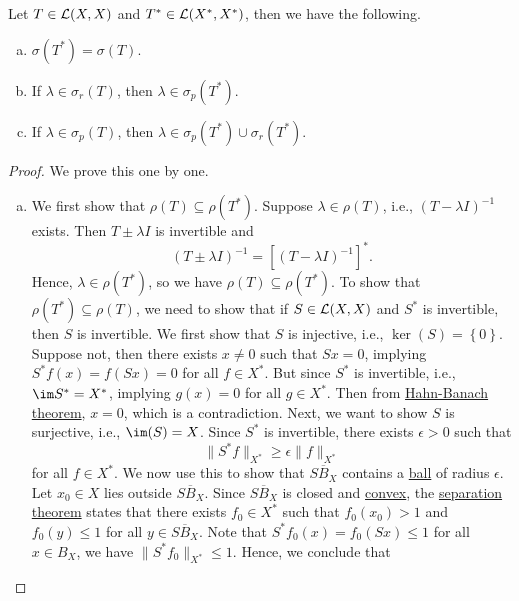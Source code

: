 \begin{theorem}
	Let \(T\in \mathcal{\MakeUppercase{l}} (X, X)\) and \(T^{\ast} \in \mathcal{\MakeUppercase{l}} (X^{\ast} , X^{\ast} )\), then we have the following.
	\begin{enumerate}[(a)]
		\item \(\sigma (T^{\ast} ) = \sigma (T)\).
		\item If \(\lambda \in \sigma _r(T)\), then \(\lambda \in \sigma _p(T^{\ast} )\).
		\item If \(\lambda \in \sigma _p(T)\), then \(\lambda \in \sigma _p(T^{\ast} ) \cup \sigma _r(T^{\ast} )\).
	\end{enumerate}
\end{theorem}
\begin{proof}
	We prove this one by one.
	\begin{enumerate}[(a)]
		\item We first show that \(\rho (T) \subseteq \rho (T^{\ast})\). Suppose \(\lambda \in \rho (T)\), i.e., \((T-\lambda I)^{-1} \) exists. Then \(T\pm \lambda I\) is invertible and
		      \[
			      (T\pm \lambda I)^{-1} = \left[ (T-\lambda I)^{-1}  \right] ^{\ast}.
		      \]
		      Hence, \(\lambda \in \rho (T^{\ast} )\), so we have \(\rho (T) \subseteq \rho (T^{\ast})\). To show that \(\rho (T^{\ast}) \subseteq \rho (T)\), we need to show that if \(S\in \mathcal{\MakeUppercase{l}} (X, X)\) and \(S^{\ast} \) is invertible, then \(S\) is invertible. We first show that \(S\) is injective, i.e., \(\ker(S)= \left\{ 0 \right\} \). Suppose not, then there exists \(x \neq 0\) such that \(Sx = 0\), implying \(S^{\ast} f(x) = f(Sx) = 0\) for all \(f\in X^{\ast} \). But since \(S^{\ast} \) is invertible, i.e., \(\im S^{\ast} = X^{\ast} \), implying \(g(x) = 0\) for all \(g\in X^{\ast} \). Then from \hyperref[thm:Hahn-Banach]{Hahn-Banach theorem}, \(x = 0\), which is a contradiction. Next, we want to show \(S\) is surjective, i.e., \(\im(S) = X\). Since \(S^{\ast} \) is invertible, there exists \(\epsilon >0\) such that
		      \[
			      \lVert S^{\ast} f \rVert _{X^{\ast} }\geq \epsilon \lVert f \rVert _{X^{\ast}}
		      \]
		      for all \(f\in X^{\ast} \). We now use this to show that \(\overline{SB_X}\) contains a \hyperref[def:ball]{ball} of radius \(\epsilon \). Let \(x_0\in X\) lies outside \(\overline{SB_X}\). Since \(\overline{SB_X}\) is closed and \hyperref[def:convex-set]{convex}, the \hyperref[thm:separation-of-a-point-from-a-convex-set]{separation theorem} states that there exists \(f_0\in X^{\ast} \) such that \(f_0(x_0)>1\) and \(f_0(y) \leq 1\) for all \(y\in \overline{SB_X}\). Note that \(S^{\ast} f_0(x) = f_0(Sx) \leq 1\) for all \(x\in B_X\), we have \(\lVert S^{\ast} f_0 \rVert_{X^{\ast} }\leq 1 \). Hence, we conclude that

\end{enumerate}
\end{proof}
